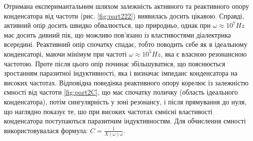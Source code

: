 Отримана експеримантальним шляхом залежність активного та реактивного опору конденсатора від частоти (рис. \ref{fig:part222}) виявилась досить цікавою. Справді, активний опір досить швидко обвалюється, що природньо, однак при $\omega \approx 10^7 Hz$ має досить дивний пік, що можливо пов'язано із властивостями діалектрика всередині. Реактивний опір спочатку спадає, тобто поводить себе як в ідеальному конденсаторі, маючи мінімум при частоті $\omega \approx 10^5 Hz$, яка є власною резонансною частотою. Проте після цього опір починає збільшуватися, що пояснюється зростанням паразитної індуктивності, яка і визначає імпеданс конденсатора на високих частотах. Відповідна поведінка реактивного опору корелює із залежністю ємності від частоти \ref{fig:part2C}, що має спочатку поличку (область ідеального конденсатора), потім сингулярність у зоні резонансу, і після прямування до нуля, що наглядно показує те, шо при високих частотах ємнісні властивості конденсатора поступаються паразитним індуктивностям. Для обчислення ємності використовувалася формула: $C = \frac{1}{X(\omega)\omega}$.


